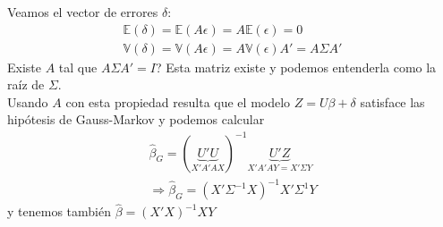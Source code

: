 \documentclass[10pt]{article}
\theoremstyle{plain}
\theoremstyle{definition}
\begin{document}
Veamos el vector de errores $\delta$:
\begin{align*}
\mathbb{E}(\delta) = \mathbb{E}(A\epsilon) = A\mathbb{E}(\epsilon) = 0\\
\mathbb{V}(\delta) = \mathbb{V}(A\epsilon) = A\mathbb{V}(\epsilon)A' = A\Sigma A'
\end{align*}
Existe $A$ tal que $A\Sigma A' = I$? Esta matriz existe y podemos entenderla como la raíz de $\Sigma$.\\

Usando $A$ con esta propiedad resulta que el modelo $Z=U\beta + \delta$ satisface las hipótesis de Gauss-Markov y podemos calcular
\begin{align*}
\hat{\beta}_{G} = (\underbrace{U'U}_{X'A'AX})^{-1}\underbrace{U'Z}_{X'A'AY = X'\Sigma Y}\\
\Rightarrow \hat{\beta}_{G} = (X'\Sigma^{-1}X)^{-1}X'\Sigma^{1}Y
\end{align*}
y tenemos también $\hat{\beta} = (X'X)^{-1}XY$
\end{document}
